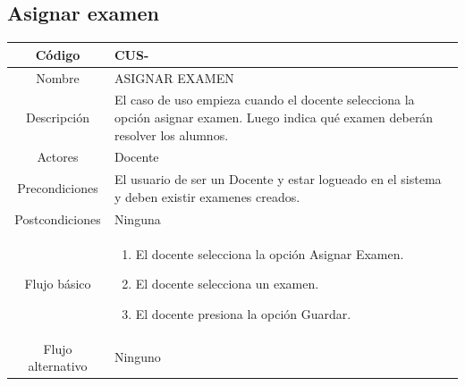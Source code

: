 \clearpage
\subsection{Asignar examen}
\begin{longtable}{|c|L{10cm}|}
	\toprule[0.8mm]
	Código &  CUS-\casodeuso\\  \midrule
	Nombre &  ASIGNAR EXAMEN\\  \midrule
	Descripción &  El caso de uso empieza cuando el docente selecciona la opción asignar examen. Luego indica qué examen deberán resolver los alumnos.\\  \midrule
	Actores &  Docente\\  \midrule
	Precondiciones &  El usuario de ser un Docente y estar logueado en el sistema y deben existir examenes creados.\\  \midrule
	Postcondiciones &  Ninguna\\  \midrule
	Flujo básico &    \begin{enumerate}
		\item El docente selecciona la opción Asignar Examen.
		\item El docente selecciona un examen.
		\item El docente presiona la opción Guardar.
	\end{enumerate}  \\ \midrule
	Flujo alternativo & Ninguno \\ \bottomrule[0.8mm]
\end{longtable}

\clearpage
